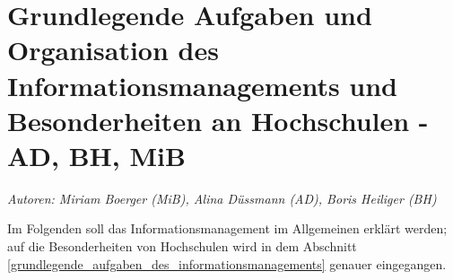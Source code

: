 \chapter{Grundlegende Aufgaben und Organisation des Informationsmanagements und Besonderheiten an Hochschulen - AD, BH, MiB}
\label{chapter_grundlagen_INM}

\textit{Autoren: Miriam Boerger (MiB), Alina Düssmann (AD), Boris Heiliger (BH)}

Im Folgenden soll das Informationsmanagement im Allgemeinen erklärt werden; auf die Besonderheiten von Hochschulen wird in dem Abschnitt \ref{grundlegende_aufgaben_des_informationsmanagements} genauer eingegangen.






